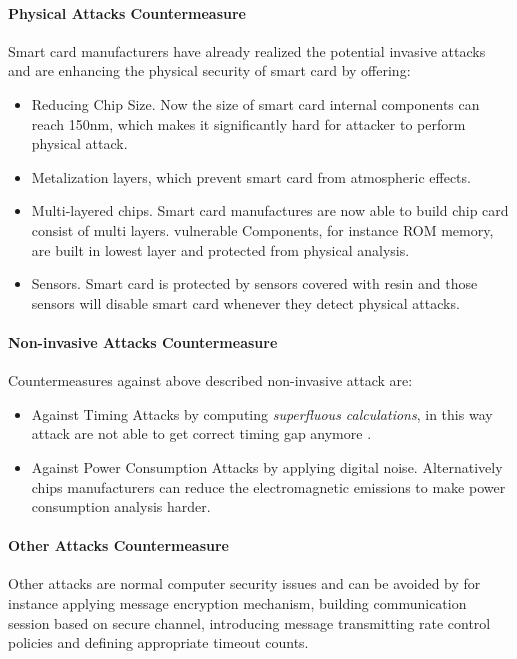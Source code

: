 \paragraph{Physical Attacks Countermeasure}
Smart card manufacturers have already realized the potential  invasive attacks and are enhancing the physical security of smart card by offering:
\begin{itemize}
\item Reducing Chip Size. Now the size of smart card internal components can reach 150nm, which makes it significantly hard for attacker to perform physical attack\cite{smart_card_attack3}.
\item Metalization layers, which prevent smart card from atmospheric effects\cite{smart_card_attack3}.
\item Multi-layered chips. Smart card manufactures are now able to build chip card consist of multi layers. vulnerable Components, for instance ROM memory, are built in lowest layer and protected from physical analysis\cite{smart_card_attack3}. 
\item Sensors.  Smart card is protected by sensors covered with resin and those sensors will disable smart card whenever they detect physical attacks\cite{smart_card_attack}.
\end{itemize}
\paragraph{Non-invasive Attacks Countermeasure}
Countermeasures against above described non-invasive attack are:
\begin{itemize}
\item Against Timing Attacks by computing \emph{superfluous calculations}, in this way attack are not  able  to get correct timing gap anymore\cite{smart_card_attack3} .
\item Against Power Consumption Attacks by applying digital noise. Alternatively chips manufacturers can reduce the electromagnetic emissions to make power consumption analysis  harder\cite{smart_card_attack3}.
\end{itemize}
\paragraph{Other Attacks Countermeasure}
Other attacks are normal computer security issues and can be avoided by for instance applying message encryption mechanism, building communication session based on secure channel, introducing message transmitting rate control policies and defining appropriate timeout counts.
